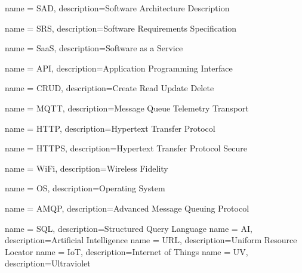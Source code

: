 {
    name = SAD,
    description={Software Architecture Description}
}

{
    name = SRS,
    description={Software Requirements Specification}
}

{
    name = SaaS,
    description={Software as a Service}
}

{
    name = API,
    description={Application Programming Interface}
}

{
    name = CRUD,
    description={Create Read Update Delete}
}

{
    name = MQTT,
    description={Message Queue Telemetry Transport}
}

{
    name = HTTP,
    description={Hypertext Transfer Protocol}
}

{
    name = HTTPS,
    description={Hypertext Transfer Protocol Secure}
}

{
    name = WiFi,
    description={Wireless Fidelity}
}

{
    name = OS,
    description={Operating System}
}

{
    name = AMQP,
    description={Advanced Message Queuing Protocol}
}

{
    name = SQL,
    description={Structured Query Language}
}
{
    name = AI,
    description={Artificial Intelligence}
}
{
    name = URL,
    description={Uniform Resource Locator}
}
{
    name = IoT,
    description={Internet of Things}
}
{
    name = UV,
    description={Ultraviolet}
}